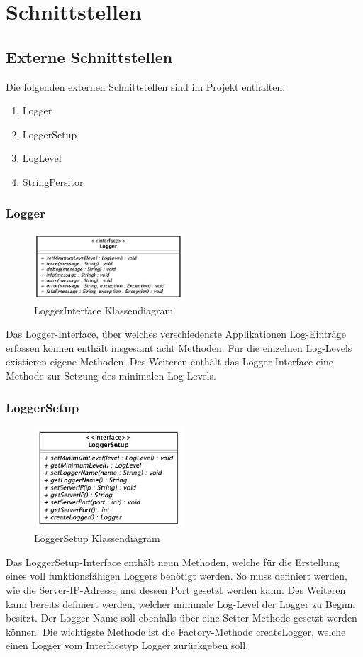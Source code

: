 \section{Schnittstellen}
\subsection{Externe Schnittstellen}
Die folgenden externen Schnittstellen sind im Projekt enthalten:
\begin{enumerate}
	\item Logger
	\item LoggerSetup
	\item LogLevel
	\item StringPersitor
\end{enumerate}

\subsubsection{Logger}
\begin{figure}[H]
	\centering
	\includegraphics[width=0.5\textwidth]{3_Schnittstellen/Bilder/loggerInterface.png}
	\caption{LoggerInterface Klassendiagram}
	\label{fig:LoggerInterface Klassendiagramm}
\end{figure}
Das Logger-Interface, über welches verschiedenste Applikationen Log-Einträge erfassen können enthält insgesamt acht Methoden. Für die einzelnen Log-Levels existieren eigene Methoden. Des Weiteren enthält das Logger-Interface eine Methode zur Setzung des minimalen Log-Levels. 
\subsubsection{LoggerSetup}
\begin{figure}[H]
	\centering
	\includegraphics[width=0.5\textwidth]{3_Schnittstellen/Bilder/loggerSetupInterface.png}
	\caption{LoggerSetup Klassendiagram}
	\label{fig:LoggerSetup Klassendiagramm}
\end{figure}
Das LoggerSetup-Interface enthält neun Methoden, welche für die Erstellung eines voll funktionsfähigen Loggers benötigt werden. So muss definiert werden, wie die Server-IP-Adresse und dessen Port gesetzt werden kann. Des Weiteren kann bereits definiert werden, welcher minimale Log-Level der Logger zu Beginn besitzt. Der Logger-Name soll ebenfalls über eine Setter-Methode gesetzt werden können. Die wichtigste Methode ist die Factory-Methode createLogger, welche einen Logger vom Interfacetyp Logger zurückgeben soll.
